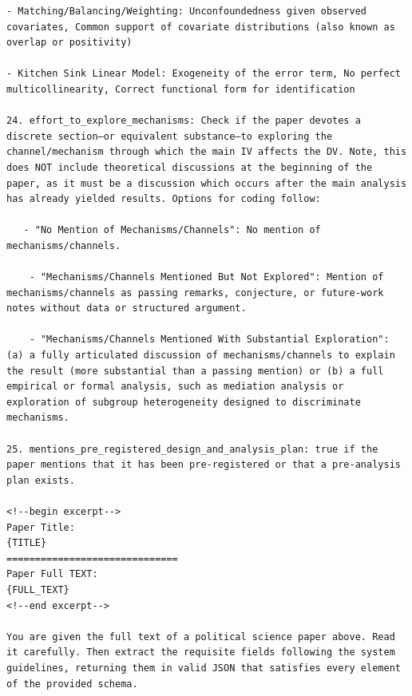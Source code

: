 \documentclass[12pt]{article}
\begin{document}
{\begin{Verbatim}[breaklines=true]
- Matching/Balancing/Weighting: Unconfoundedness given observed covariates, Common support of covariate distributions (also known as overlap or positivity)

- Kitchen Sink Linear Model: Exogeneity of the error term, No perfect multicollinearity, Correct functional form for identification

24. effort_to_explore_mechanisms: Check if the paper devotes a discrete section—or equivalent substance—to exploring the channel/mechanism through which the main IV affects the DV. Note, this does NOT include theoretical discussions at the beginning of the paper, as it must be a discussion which occurs after the main analysis has already yielded results. Options for coding follow:
 
   - "No Mention of Mechanisms/Channels": No mention of mechanisms/channels.

    - "Mechanisms/Channels Mentioned But Not Explored": Mention of mechanisms/channels as passing remarks, conjecture, or future-work notes without data or structured argument.

    - "Mechanisms/Channels Mentioned With Substantial Exploration": (a) a fully articulated discussion of mechanisms/channels to explain the result (more substantial than a passing mention) or (b) a full empirical or formal analysis, such as mediation analysis or exploration of subgroup heterogeneity designed to discriminate mechanisms. 

25. mentions_pre_registered_design_and_analysis_plan: true if the paper mentions that it has been pre-registered or that a pre-analysis plan exists.

<!--begin excerpt-->
Paper Title: 
{TITLE}
==============================
Paper Full TEXT: 
{FULL_TEXT}
<!--end excerpt-->

You are given the full text of a political science paper above. Read it carefully. Then extract the requisite fields following the system guidelines, returning them in valid JSON that satisfies every element of the provided schema. 

\end{Verbatim}
}
\vspace{1em}
\end{document}
